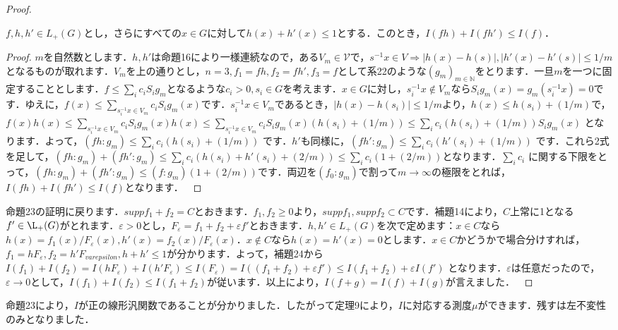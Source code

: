 \begin{proof}
\begin{lem}
$f, h, h'\in L_{+}(G)$とし，さらにすべての$x \in G$に対して$h(x)+h'(x) \le 1$とする．このとき，$I(fh)+I(fh') \le I(f)$．
\end{lem}
\begin{proof}
$m$を自然数とします．$h,h'$は命題16により一様連続なので，ある$V_m \in \mathscr{V}$で，$s^{-1}x \in V \Rightarrow |h(x)-h(s)|, |h'(x)-h'(s)| \le 1/m$となるものが取れます．$V_m$を上の通りとし，$n=3, f_1=fh, f_2=fh', f_3=f$として系22のような$(g_m)_{m \in \mathbb{N}}$をとります．一旦$m$を一つに固定することとします．$f \le \sum_{i}c_i S_{i}g_m$となるような$c_i>0, s_i \in G$を考えます．$x \in G$に対し，$s_{i}^{-1}x \not\in V_m$なら$S_{i}g_{m}(x)=g_{m}(s_{i}^{-1}x)=0$です．ゆえに，$f(x) \le \sum_{s_{i}^{-1}x \in V_m} c_{i}S_{i}g_{m}(x)$です．$s_{i}^{-1}x \in V_m$であるとき，$|h(x)-h(s_i)| \le 1/m$より，$h(x) \le h(s_i)+(1/m)$で，$f(x)h(x) \le \sum_{s_{i}^{-1}x \in V_m} c_{i}S_{i}g_{m}(x)h(x) \le \sum_{s_{i}^{-1}x \in V_m} c_{i}S_{i}g_{m}(x)(h(s_i)+(1/m)) \le \sum_{i}c_{i}( h(s_i)+(1/m) )S_{i}g_{m}(x)$ となります．よって，$( fh \colon g_m ) \le \sum_{i}c_{i} ( h(s_i)+(1/m) )$ です．$h'$も同様に，$( fh' \colon g_m ) \le \sum_{i}c_{i} ( h'(s_i)+(1/m) )$ です．これら2式を足して，$( fh \colon g_m )+( fh' \colon g_m ) \le \sum_{i}c_{i} ( h(s_i)+h'(s_i)+(2/m) ) \le \sum_{i}c_{i} ( 1+(2/m) )$となります．$\sum_{i}c_{i}$ に関する下限をとって，$( fh \colon g_m )+( fh' \colon g_m ) \le ( f \colon g_m ) ( 1+(2/m) )$です．両辺を$(f_0 \colon g_m)$で割って$m \to \infty$の極限をとれば，$I(fh)+I(fh') \le I(f)$となります．　
\end{proof}
命題23の証明に戻ります．$supp f_{1}+f_{2}=C$とおきます．$f_1, f_2 \ge 0$より，$supp f_1, suppf_2 \subset C$です．補題14により，$C$上常に1となる$f' \in \L_{+}(G)$がとれます．$\varepsilon>0$とし，$F_{\varepsilon}=f_{1}+f_{2}+\varepsilon f'$とおきます．$h,h' \in L_{+}(G)$を次で定めます：$x \in C$なら$h(x)=f_{1}(x)/F_{\varepsilon}(x), h'(x)=f_{2}(x)/F_{\varepsilon}(x)$．$x \not\in C$なら$h(x)=h'(x)=0$とします．$x \in C$かどうかで場合分けすれば，$f_{1}=hF_{\varepsilon}, f_{2}=h'F_{varepsilon}, h+h' \le 1$が分かります．よって，補題24から$I(f_1)+I(f_2) = I(hF_{\varepsilon})+I(h'F_{\varepsilon}) \le I(F_{\varepsilon})=I ( (f_{1}+f_{2})+\varepsilon f' ) \le I(f_{1}+f_{2})+ \varepsilon I(f')$ となります．$\varepsilon$は任意だったので，$\varepsilon \to 0$として，$I(f_1)+I(f_2) \le I(f_{1}+f_{2})$が従います．以上により，$I(f+g)=I(f)+I(g)$が言えました．　
\end{proof}

命題23により，$I$が正の線形汎関数であることが分かりました．したがって定理9により，$I$に対応する測度$\mu$ができます．残すは左不変性のみとなりました．

